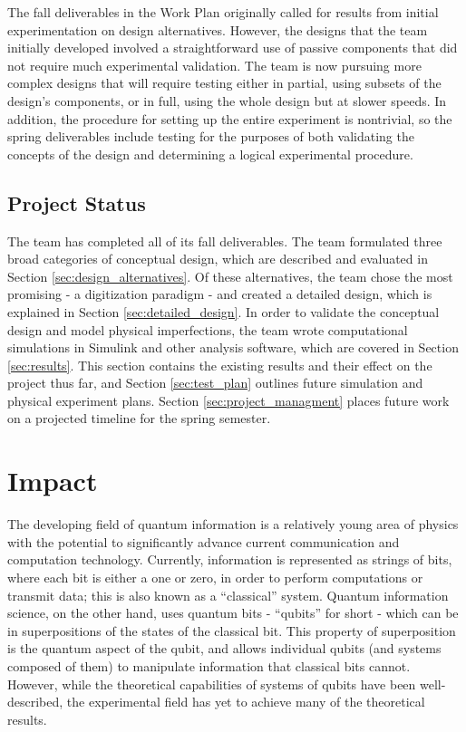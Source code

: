 \documentclass[pdftex,12pt,a4paper]{article}
\begin{document}
The fall deliverables in the Work Plan originally called for results from initial experimentation on design alternatives. However, the designs that the team initially developed involved a straightforward use of passive components that did not require much experimental validation. The team is now pursuing more complex designs that will require testing either in partial, using subsets of the design's components, or in full, using the whole design but at slower speeds. In addition, the procedure for setting up the entire experiment is nontrivial, so the spring deliverables include testing for the purposes of both validating the concepts of the design and determining a logical experimental procedure.

\subsection{Project Status}
The team has completed all of its fall deliverables. The team formulated three broad categories of conceptual design, which are described and evaluated in Section \ref{sec:design_alternatives}. Of these alternatives, the team chose the most promising - a digitization paradigm - and created a detailed design, which is explained in Section \ref{sec:detailed_design}. In order to validate the conceptual design and model physical imperfections, the team wrote computational simulations in Simulink and other analysis software, which are covered in Section \ref{sec:results}. This section contains the existing results and their effect on the project thus far, and Section \ref{sec:test_plan} outlines future simulation and physical experiment plans. Section \ref{sec:project_managment} places future work on a projected timeline for the spring semester.




\section{Impact}
The developing field of quantum information is a relatively young area of physics with the potential to significantly advance current communication and computation technology. Currently, information is represented as strings of bits, where each bit is either a one or zero, in order to perform computations or transmit data; this is also known as a “classical” system. Quantum information science, on the other hand, uses quantum bits - “qubits” for short - which can be in superpositions of the states of the classical bit. This property of superposition is the quantum aspect of the qubit, and allows individual qubits (and systems composed of them) to manipulate information that classical bits cannot. However, while the theoretical capabilities of systems of qubits have been well-described, the experimental field has yet to achieve many of the theoretical results.
\end{document}
